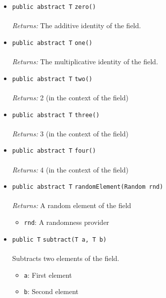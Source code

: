 \begin{itemize}
\item \lstinline|public abstract T| \lstinline|zero|\lstinline|()|\\ \\[-0.6em]
\emph{Returns:} The additive identity of the field.



\item \lstinline|public abstract T| \lstinline|one|\lstinline|()|\\ \\[-0.6em]
\emph{Returns:} The multiplicative identity of the field.



\item \lstinline|public abstract T| \lstinline|two|\lstinline|()|\\ \\[-0.6em]
\emph{Returns:} 2 (in the context of the field)



\item \lstinline|public abstract T| \lstinline|three|\lstinline|()|\\ \\[-0.6em]
\emph{Returns:} 3 (in the context of the field)



\item \lstinline|public abstract T| \lstinline|four|\lstinline|()|\\ \\[-0.6em]
\emph{Returns:} 4 (in the context of the field)



\item \lstinline|public abstract T| \lstinline|randomElement|\lstinline|(Random rnd)|\\ \\[-0.6em]
\emph{Returns:} A random element of the field
\begin{itemize}
\item \lstinline|rnd|: A randomness provider
\end{itemize}



\item \lstinline|public T| \lstinline|subtract|\lstinline|(T a, T b)|\\ \\[-0.6em]
Subtracts two elements of the field.
\begin{itemize}
\item \lstinline|a|: First element
\item \lstinline|b|: Second element
\end{itemize}


\end{itemize}
